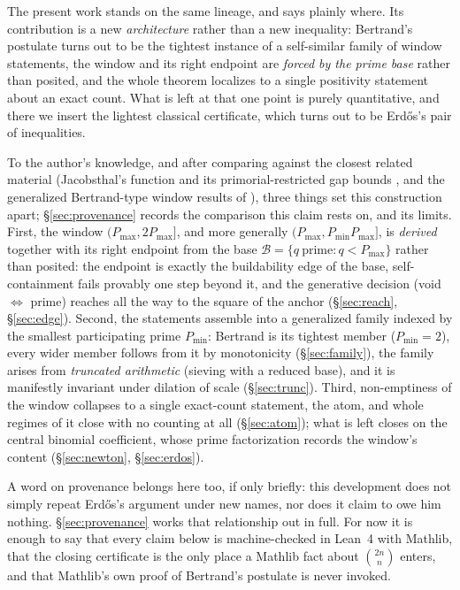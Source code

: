 \documentclass[11pt,a4paper]{amsart}
\theoremstyle{plain}
\theoremstyle{definition}
\theoremstyle{plain}
\theoremstyle{remark}
\begin{document}
The present work stands on the same lineage, and says plainly where. Its contribution is
a new \emph{architecture} rather than a new inequality: Bertrand's postulate turns out to
be the tightest instance of a self-similar family of window statements, the window and
its right endpoint are \emph{forced by the prime base} rather than posited, and the whole
theorem localizes to a single positivity statement about an exact count. What is left at
that one point is purely quantitative, and there we insert the lightest classical
certificate, which turns out to be Erd\H{o}s's pair of inequalities.

To the author's knowledge, and after comparing against the closest related material
(Jacobsthal's function and its primorial-restricted gap bounds
\cite{jacobsthal1961,iwaniec1978}, and the generalized Bertrand-type window results of
\cite{daspaul2019}), three things set this construction apart; \S\ref{sec:provenance}
records the comparison this claim rests on, and its limits. First, the window
$(P_{\max},2P_{\max}]$, and more generally $(P_{\max},P_{\min}P_{\max}]$, is
\emph{derived} together with its right endpoint from the base
$\mathcal{B}=\{q\ \text{prime}: q<P_{\max}\}$ rather than posited: the endpoint is exactly
the buildability edge of the base, self-containment fails provably one step beyond it, and
the generative decision (void $\Leftrightarrow$ prime) reaches all the way to the square
of the anchor (\S\ref{sec:reach}, \S\ref{sec:edge}). Second, the statements assemble into
a generalized family indexed by the smallest participating prime $P_{\min}$: Bertrand is
its tightest member ($P_{\min}=2$), every wider member follows from it by monotonicity
(\S\ref{sec:family}), the family arises from \emph{truncated arithmetic} (sieving with
a reduced base), and it is manifestly invariant under dilation of scale
(\S\ref{sec:trunc}). Third, non-emptiness of the window collapses to a single exact-count
statement, the atom, and whole regimes of it close with no counting at all
(\S\ref{sec:atom}); what is left closes on the central binomial coefficient, whose prime
factorization records the window's content (\S\ref{sec:newton}, \S\ref{sec:erdos}).

A word on provenance belongs here too, if only briefly: this development does not simply
repeat Erd\H{o}s's argument under new names, nor does it claim to owe him nothing.
\S\ref{sec:provenance} works that relationship out in full. For now it is enough to say
that every claim below is machine-checked in Lean~4 with Mathlib, that the closing
certificate is the only place a Mathlib fact about $\binom{2n}{n}$ enters, and that
Mathlib's own proof of Bertrand's postulate is never invoked.
\end{document}
